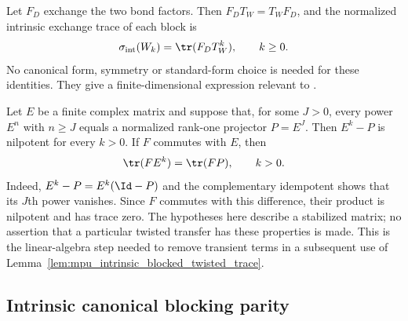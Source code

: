 \begin{lemma}
    \label{lem:mpu_intrinsic_blocked_twisted_trace}
    \leanok
    Let $F_D$ exchange the two bond factors. Then $F_DT_W=T_WF_D$, and the
    normalized intrinsic exchange trace of each block is
    \begin{align}
        \sigma_{\mathrm{int}}(W_k)=\tr(F_DT_W^k),\qquad k\geq0.
    \end{align}
    No canonical form, symmetry or standard-form choice is needed for these
    identities. They give a finite-dimensional expression relevant to
    \cite[lines~1633--1733]{Cirac2017MPU}.
\end{lemma}

\begin{lemma}
    \label{lem:mpu_stabilized_commuting_weighted_trace}
    \leanok
    Let $E$ be a finite complex matrix and suppose that, for some $J>0$,
    every power $E^n$ with $n\geq J$ equals a normalized rank-one projector
    $P=E^J$. Then $E^k-P$ is nilpotent for every $k>0$. If $F$ commutes
    with $E$, then
    \[
        \tr(FE^k)=\tr(FP),\qquad k>0.
    \]
    Indeed, $E^k-P=E^k(\Id-P)$ and the complementary idempotent shows
    that its $J$th power vanishes. Since $F$ commutes with this difference,
    their product is nilpotent and has trace zero. The hypotheses here
    describe a stabilized matrix; no assertion that a particular twisted
    transfer has these properties is made. This is the linear-algebra step
    needed to remove transient terms in a subsequent use of
    Lemma~\ref{lem:mpu_intrinsic_blocked_twisted_trace}.
\end{lemma}

\subsection{Intrinsic canonical blocking parity}

